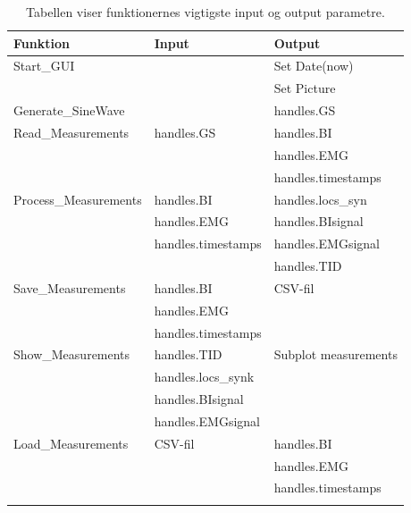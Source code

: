\begin{table}[H]
\center
\begin{tabularx}{\linewidth}{l  X  X}
     \textbf{Funktion}	&	\textbf{Input}		&	\textbf{Output} \\ \midrule
     
     Start\_GUI	&		&	Set Date(now)\\   \addlinespace[2mm]
     			&		&	Set Picture\\   \addlinespace[2mm]\addlinespace[2mm]\hline\addlinespace[2mm]
  
	Generate\_SineWave   	&		&	handles.GS\\   \addlinespace[2mm]\hline\addlinespace[2mm]
Read\_Measurements	&	handles.GS	&	handles.BI\\   \addlinespace[2mm]
			    &		&	handles.EMG\\   \addlinespace[2mm]
			    &		&	handles.timestamps\\   \addlinespace[2mm]\hline\addlinespace[2mm]
			    Process\_Measurements    &	handles.BI	&	handles.locs\_syn\\   \addlinespace[2mm]
						&	handles.EMG	&	handles.BIsignal\\   \addlinespace[2mm]
						&	handles.timestamps	&	handles.EMGsignal\\   \addlinespace[2mm]
						&	& handles.TID	\\   \addlinespace[2mm]\hline\addlinespace[2mm]
						
				Save\_Measurements    &handles.BI	&	CSV-fil\\   				\addlinespace[2mm]
			    &	handles.EMG	&	\\   \addlinespace[2mm]
			    &	handles.timestamps	&	\\   \addlinespace[2mm]\hline\addlinespace[2mm]
   		
Show\_Measurements	    &	handles.TID&	Subplot measurements\\   \addlinespace[2mm]
   		    			&	handles.locs\_synk&						\\   \addlinespace[2mm]
						&	handles.BIsignal&						\\   \addlinespace[2mm]
   		    			&	handles.EMGsignal&						\\   \addlinespace[2mm]\hline\addlinespace[2mm]   
   		Load\_Measurements	    &	CSV-fil	&	handles.BI\\   \addlinespace[2mm]
   		&		&	handles.EMG\\   \addlinespace[2mm]
   		&		&	handles.timestamps\\   \addlinespace[2mm]
     \bottomrule                                                                                                                   
    \end{tabularx}
    \caption {Tabellen viser funktionernes vigtigste input og output parametre.}
    \label{tab:sw1}
	
\end{table}




